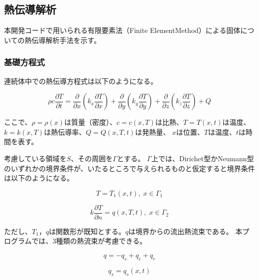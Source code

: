 \documentclass[a4paper,pandoc,ja=standard]{bxjsarticle}
\begin{document}
\hypertarget{ux71b1ux4f1dux5c0eux89e3ux6790}{%
\subsection{熱伝導解析}\label{ux71b1ux4f1dux5c0eux89e3ux6790}}

本開発コードで用いられる有限要素法（Finite ElementMethod）による固体についての熱伝導解析手法を示す。

\hypertarget{ux57faux790eux65b9ux7a0bux5f0f-1}{%
\subsubsection{基礎方程式}\label{ux57faux790eux65b9ux7a0bux5f0f-1}}

連続体中での熱伝導方程式は以下のようになる。

\begin{equation}
  \rho c \frac{\partial T}{\partial t} =
  \frac{\partial}{\partial x}\left(k_x \frac{\partial T}{\partial x}\right)
+ \frac{\partial}{\partial y}\left(k_y \frac{\partial T}{\partial y}\right)
+ \frac{\partial}{\partial z}\left(k_z \frac{\partial T}{\partial z}\right) + Q
\label{eq:2.4.1}
\end{equation}

ここで、\(\rho=\rho(x)\)は質量（密度）、\(c=c(x,T)\)は比熱、\(T=T(x,t)\)は温度、\(k=k(x,T)\)は熱伝導率、\(Q=Q(x,T,t)\)は発熱量、
\(x\)は位置、\(T\)は温度、\(t\)は時間を表す。

考慮している領域を\(S\)、その周囲を\(\Gamma\)とする。
\(\Gamma\)上では、Dirichet型かNeumann型のいずれかの境界条件が、いたるところで与えられるものと仮定すると境界条件は以下のようになる。

\begin{equation}
T = T_1(x,t), \; x \in \Gamma_1
\label{eq:2.4.2}
\end{equation}

\begin{equation}
k \frac{\partial T}{\partial n} = q(x,T,t), \; x \in \Gamma_2
\label{eq:2.4.3}
\end{equation}

ただし、\(T_1\)，\(q\)は関数形が既知とする。\(q\)は境界からの流出熱流束である。
本プログラムでは、3種類の熱流束が考慮できる。

\begin{equation}
q=-q_s+q_c+q_r
\label{eq:2.4.4}
\end{equation}

\begin{equation}
q_s=q_s(x,t)
\label{eq:2.4.5}
\end{equation}
\end{document}

